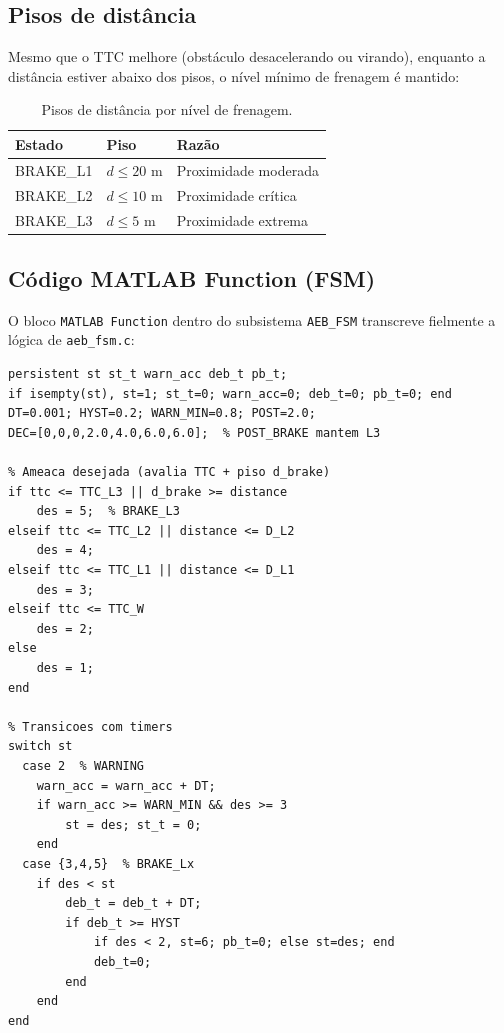 \documentclass[12pt,a4paper]{article}
\begin{document}
\subsection{Pisos de distância}

Mesmo que o TTC melhore (obstáculo desacelerando ou virando), enquanto a
distância estiver abaixo dos pisos, o nível mínimo de frenagem é mantido:

\begin{table}[H]
    \centering
    \caption{Pisos de distância por nível de frenagem.}
    \label{tab:floor}
    \begin{tabular}{@{}lll@{}}
        \toprule
        Estado & Piso & Razão \\
        \midrule
        BRAKE\_L1 & $d \leq 20$ m & Proximidade moderada \\
        BRAKE\_L2 & $d \leq 10$ m & Proximidade crítica  \\
        BRAKE\_L3 & $d \leq 5$ m  & Proximidade extrema  \\
        \bottomrule
    \end{tabular}
\end{table}

\subsection{Código MATLAB Function (FSM)}

O bloco \texttt{MATLAB Function} dentro do subsistema \texttt{AEB\_FSM}
transcreve fielmente a lógica de \texttt{aeb\_fsm.c}:

\begin{lstlisting}[style=mstyle, caption={Núcleo da FSM --- MATLAB Function (trecho).}]
persistent st st_t warn_acc deb_t pb_t;
if isempty(st), st=1; st_t=0; warn_acc=0; deb_t=0; pb_t=0; end
DT=0.001; HYST=0.2; WARN_MIN=0.8; POST=2.0;
DEC=[0,0,0,2.0,4.0,6.0,6.0];  % POST_BRAKE mantem L3

% Ameaca desejada (avalia TTC + piso d_brake)
if ttc <= TTC_L3 || d_brake >= distance
    des = 5;  % BRAKE_L3
elseif ttc <= TTC_L2 || distance <= D_L2
    des = 4;
elseif ttc <= TTC_L1 || distance <= D_L1
    des = 3;
elseif ttc <= TTC_W
    des = 2;
else
    des = 1;
end

% Transicoes com timers
switch st
  case 2  % WARNING
    warn_acc = warn_acc + DT;
    if warn_acc >= WARN_MIN && des >= 3
        st = des; st_t = 0;
    end
  case {3,4,5}  % BRAKE_Lx
    if des < st
        deb_t = deb_t + DT;
        if deb_t >= HYST
            if des < 2, st=6; pb_t=0; else st=des; end
            deb_t=0;
        end
    end
end
\end{lstlisting}
\end{document}
